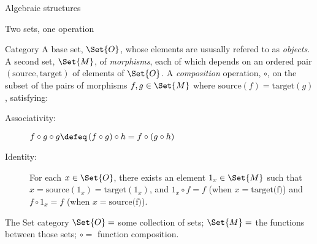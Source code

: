 \begin{plSection}{Algebraic structures}
\begin{plSection}{Two sets, one operation}
\begin{plSection}{Category}
A base set, $\Set{O}$, 
whose elements are ususally refered to as \textit{objects}.
A second set, $\Set{M}$, of \textit{morphisms}, 
each of which depends on an ordered pair 
$\left( \text{source} , \text{target} \right)$ of elements of 
$\Set{O}$. 
A \textit{composition} operation, $\circ$, on 
the subset of the pairs of morphisms $f , g \in \Set{M}$
where $\text{source}(f) = \text{target}(g)$, satisfying:
\begin{description}
\item[Associativity:] $f \circ g \circ g \defeq 
\left( f \circ g \right) \circ h 
= f \circ \left( g \circ h \right)$
\item[Identity:] For each $x \in \Set{O}$, there exists an element
$1_x \in \Set{M}$ such that 
$x = \text{source}(1_x) = \text{target}(1_x)$, and 
$1_x \circ f = f$ (when $x = \text{target(f)}$) and
$f \circ 1_x = f$ (when $x = \text{source(f)}$).
\end{description}

 \begin{plExample}{The Set category}{}
 $\Set{O} = $ some collection of sets;
 $\Set{M} = $ the functions between those sets;
 $\circ = $ function composition.  
 \end{plExample}
\end{plSection}
\end{plSection}
\end{plSection}
 